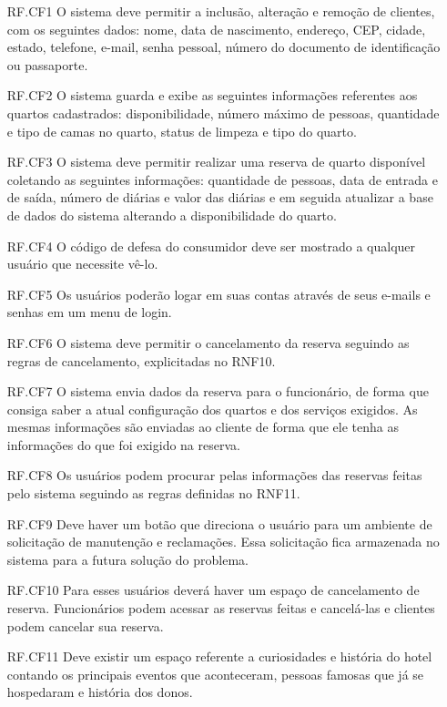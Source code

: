 \documentclass[notitlepage]{article}
\begin{document}
\begin{enumerate}
	\item[RF.CF1 ] O sistema deve permitir a inclusão, alteração e remoção de clientes, com os seguintes dados: nome, data de nascimento, endereço, CEP, cidade, estado, telefone, e-mail, senha pessoal, número do documento de identificação ou passaporte. 
	\item[RF.CF2 ] O sistema guarda e exibe as seguintes informações referentes aos quartos cadastrados: disponibilidade, número máximo de pessoas, quantidade e tipo de camas no quarto, status de limpeza e tipo do quarto.
	\item[RF.CF3 ] O sistema deve permitir realizar uma reserva de quarto disponível coletando as seguintes informações: quantidade de pessoas, data de entrada e de saída, número de diárias e valor das diárias e em seguida atualizar a base de dados do sistema alterando a disponibilidade do quarto. 
	\item[RF.CF4 ] O código de defesa do consumidor deve ser mostrado a qualquer usuário que necessite vê-lo.
	\item[RF.CF5 ] Os usuários poderão logar em suas contas através de seus e-mails e senhas em um menu de login.
	\item[RF.CF6 ] O sistema deve permitir o cancelamento da reserva seguindo as regras de cancelamento, explicitadas no RNF10. 
	\item[RF.CF7 ] O sistema envia dados da reserva para o funcionário, de forma que consiga saber a atual configuração dos quartos e dos serviços exigidos. As mesmas informações são enviadas ao cliente de forma que ele tenha as informações do que foi exigido na reserva.
	\item[RF.CF8 ] Os usuários podem procurar pelas informações das reservas feitas pelo sistema seguindo as regras definidas no RNF11. 
	\item[RF.CF9 ] Deve haver um botão que direciona o usuário para um ambiente de solicitação de manutenção e reclamações. Essa solicitação fica armazenada no sistema para a futura solução do problema.
	\item[RF.CF10 ] Para esses usuários deverá haver um espaço de cancelamento de reserva. Funcionários podem acessar as reservas feitas e cancelá-las e clientes podem cancelar sua reserva. 
	\item[RF.CF11 ] Deve existir um espaço referente a curiosidades e história do hotel contando os principais eventos que aconteceram, pessoas famosas que já se hospedaram e história dos donos.
\end{enumerate}
\end{document}
